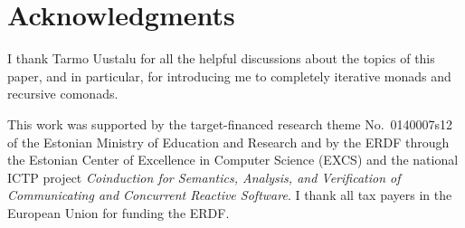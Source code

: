 \documentclass[copyright,creativecommons]{eptcs}
\begin{document}
\section*{Acknowledgments}

I thank Tarmo Uustalu for all the helpful discussions about the topics of this
paper, and in particular, for introducing me to completely iterative monads and
recursive comonads.

This work was supported by the target-financed research theme No.~0140007s12 of
the Estonian Ministry of Education and Research and by the ERDF through the
Estonian Center of Excellence in Computer Science (EXCS) and the national ICTP
project \emph{Coinduction for Semantics, Analysis, and Verification of
Communicating and Concurrent Reactive Software}. I thank all tax payers in the
European Union for funding the ERDF.



\end{document}
